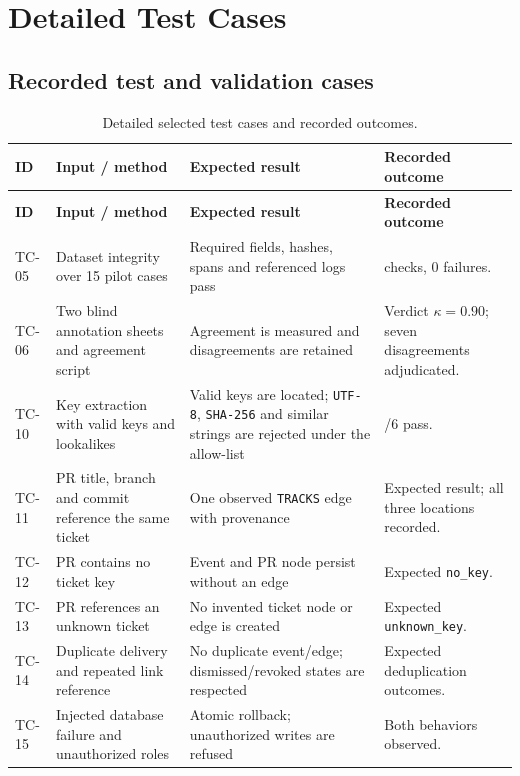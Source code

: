 \chapter{Detailed Test Cases}

\section{Recorded test and validation cases}

\begin{longtable}{>{\raggedright\arraybackslash}p{}>{\raggedright\arraybackslash}p{}>{\raggedright\arraybackslash}p{}>{\raggedright\arraybackslash}p{}}
\caption{Detailed selected test cases and recorded outcomes.}\label{tab:appendix-tests}\\
\toprule
\textbf{ID} & \textbf{Input / method} & \textbf{Expected result} & \textbf{Recorded outcome}\\
\midrule
\endfirsthead
\toprule
\textbf{ID} & \textbf{Input / method} & \textbf{Expected result} & \textbf{Recorded outcome}\\
\midrule
\endhead
TC-05 & Dataset integrity over 15 pilot cases & Required fields, hashes, spans and referenced logs pass & 138 checks, 0 failures.\\
TC-06 & Two blind annotation sheets and agreement script & Agreement is measured and disagreements are retained & Verdict $\kappa=0.90$; seven disagreements adjudicated.\\
TC-10 & Key extraction with valid keys and lookalikes & Valid keys are located; \texttt{UTF-8}, \texttt{SHA-256} and similar strings are rejected under the allow-list & 6/6 pass.\\
TC-11 & PR title, branch and commit reference the same ticket & One observed \texttt{TRACKS} edge with provenance & Expected result; all three locations recorded.\\
TC-12 & PR contains no ticket key & Event and PR node persist without an edge & Expected \texttt{no\_key}.\\
TC-13 & PR references an unknown ticket & No invented ticket node or edge is created & Expected \texttt{unknown\_key}.\\
TC-14 & Duplicate delivery and repeated link reference & No duplicate event/edge; dismissed/revoked states are respected & Expected deduplication outcomes.\\
TC-15 & Injected database failure and unauthorized roles & Atomic rollback; unauthorized writes are refused & Both behaviors observed.\\

\end{longtable}
